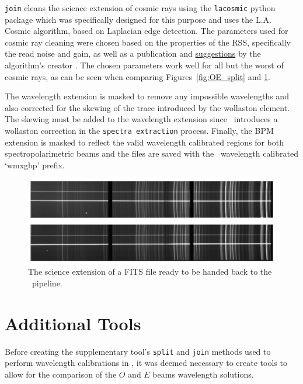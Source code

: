\texttt{join} cleans the science extension of cosmic rays using the \texttt{lacosmic} python package which was specifically designed for this purpose and uses the L.A. Cosmic algorithm, based on Laplacian edge detection. The parameters used for cosmic ray cleaning were chosen based on the properties of the \gls{RSS}, specifically the read noise and gain, as well as a publication and \hyperlink{http://www.astro.yale.edu/dokkum/lacosmic/pars.html}{suggestions} by the algorithm's creator \citep{lacosmic}. The chosen parameters work well for all but the worst of cosmic rays, as can be seen when comparing Figures~\ref{fig:OE_split} and \ref{fig:polsalt_post_wav_cal}.
\prgph

The wavelength extension is masked to remove any impossible wavelengths and also corrected for the skewing of the trace introduced by the wollaston element. The skewing must be added to the wavelength extension since \polsalt\ introduces a wollaston correction in the \texttt{spectra extraction} process. Finally, the \gls{BPM} extension is masked to reflect the valid wavelength calibrated regions for both spectropolarimetric beams and the files are saved with the \polsalt\ wavelength calibrated `wmxgbp' prefix.

\begin{figure}[t]
    \centering
    \includegraphics[width = 1.0\textwidth]{figures/3_post_wav_cal.pdf}
    \caption{The science extension of a \gls{FITS} file ready to be handed back to the \polsalt\ pipeline.}
    \label{fig:polsalt_post_wav_cal}
\end{figure}


\section{Additional Tools}\label{sec:add_tools}

Before creating the supplementary tool's \texttt{split} and \texttt{join} methods used to perform wavelength calibrations in \iraf, it was deemed necessary to create tools to allow for the comparison of the $O$ and $E$ beams wavelength solutions.

